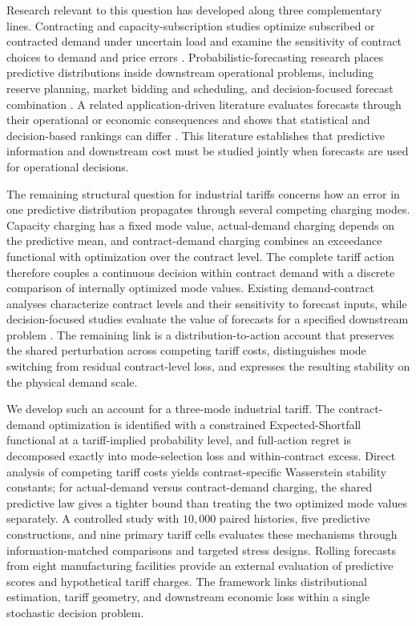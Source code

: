 \documentclass[Times1COL]{WileyNJDv5}
\begin{document}
Research relevant to this question has developed along three
complementary lines. Contracting and capacity-subscription studies
optimize subscribed or contracted demand under uncertain load and
examine the sensitivity of contract choices to demand and price errors
\cite{BjarghovEtAl2022,WuEtAl2022,FerdavaniEtAl2018,FerdavaniHooshmand2019,LimaEtAl2026}.
Probabilistic-forecasting research places predictive distributions
inside downstream operational problems, including reserve planning,
market bidding and scheduling, and decision-focused forecast
combination
\cite{WangEtAl2023,BeykirchEtAl2024,StratigakosEtAl2025}.
A related application-driven literature evaluates forecasts through
their operational or economic consequences and shows that statistical
and decision-based rankings can differ
\cite{MaciejowskaEtAl2026,HoubenEtAl2026}.
This literature establishes that predictive information and downstream
cost must be studied jointly when forecasts are used for operational
decisions.

The remaining structural question for industrial tariffs concerns how
an error in one predictive distribution propagates through several
competing charging modes. Capacity charging has a fixed mode value,
actual-demand charging depends on the predictive mean, and
contract-demand charging combines an exceedance functional with
optimization over the contract level. The complete tariff action
therefore couples a continuous decision within contract demand with a
discrete comparison of internally optimized mode values. Existing
demand-contract analyses characterize contract levels and their
sensitivity to forecast inputs, while decision-focused studies evaluate
the value of forecasts for a specified downstream problem
\cite{FerdavaniHooshmand2019,BeykirchEtAl2024,StratigakosEtAl2025}.
The remaining link is a distribution-to-action account that preserves
the shared perturbation across competing tariff costs, distinguishes
mode switching from residual contract-level loss, and expresses the
resulting stability on the physical demand scale.

We develop such an account for a three-mode industrial tariff. The
contract-demand optimization is identified with a constrained
Expected-Shortfall functional at a tariff-implied probability level,
and full-action regret is decomposed exactly into mode-selection loss
and within-contract excess. Direct analysis of competing tariff costs
yields contrast-specific Wasserstein stability constants; for
actual-demand versus contract-demand charging, the shared predictive
law gives a tighter bound than treating the two optimized mode values
separately. A controlled study with $10{,}000$ paired histories, five
predictive constructions, and nine primary tariff cells evaluates
these mechanisms through information-matched comparisons and targeted
stress designs. Rolling forecasts from eight manufacturing facilities
provide an external evaluation of predictive scores and hypothetical
tariff charges. The framework links distributional estimation, tariff
geometry, and downstream economic loss within a single stochastic
decision problem.
\end{document}
